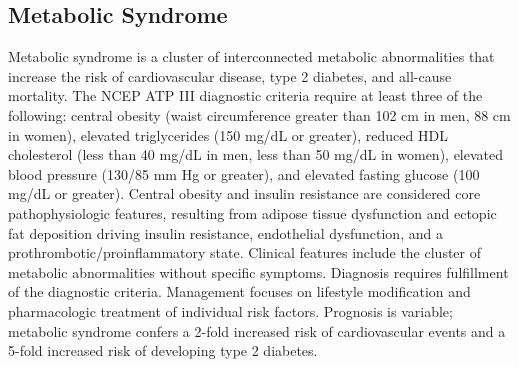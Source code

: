 \label{sec:Obesity and Overweight}

\subsection{Metabolic Syndrome}
\label{sec:Metabolic Syndrome}
Metabolic syndrome is a cluster of interconnected metabolic abnormalities that increase the risk of cardiovascular disease, type 2 diabetes, and all-cause mortality. The NCEP ATP III diagnostic criteria require at least three of the following: central obesity (waist circumference greater than 102 cm in men, 88 cm in women), elevated triglycerides (150 mg/dL or greater), reduced HDL cholesterol (less than 40 mg/dL in men, less than 50 mg/dL in women), elevated blood pressure (130/85 mm Hg or greater), and elevated fasting glucose (100 mg/dL or greater). Central obesity and insulin resistance are considered core pathophysiologic features, resulting from adipose tissue dysfunction and ectopic fat deposition driving insulin resistance, endothelial dysfunction, and a prothrombotic/proinflammatory state. Clinical features include the cluster of metabolic abnormalities without specific symptoms. Diagnosis requires fulfillment of the diagnostic criteria. Management focuses on lifestyle modification and pharmacologic treatment of individual risk factors. Prognosis is variable; metabolic syndrome confers a 2-fold increased risk of cardiovascular events and a 5-fold increased risk of developing type 2 diabetes.

